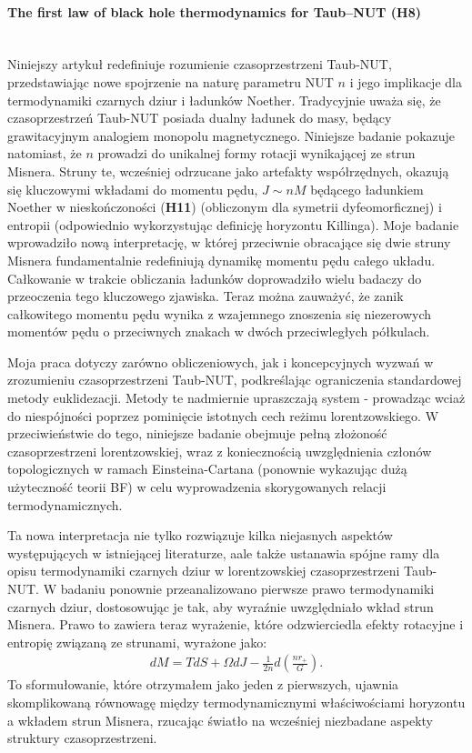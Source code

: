 \documentclass[12pt,a4paper]{article}
\newcommand{\myparagraph}[1]{\paragraph{#1}\mbox{}\\}
\begin{document}

\myparagraph{The first law of black hole thermodynamics for Taub–NUT (H8)} 

Niniejszy artykuł redefiniuje rozumienie czasoprzestrzeni Taub-NUT, przedstawiając nowe spojrzenie na naturę parametru NUT $n$ i jego implikacje dla termodynamiki czarnych dziur i ładunków Noether. Tradycyjnie uważa się, że czasoprzestrzeń Taub-NUT posiada dualny ładunek do masy, będący grawitacyjnym analogiem monopolu magnetycznego. Niniejsze badanie pokazuje natomiast, że $n$ prowadzi do unikalnej formy rotacji wynikającej ze strun Misnera. Struny te, wcześniej odrzucane jako artefakty współrzędnych, okazują się kluczowymi wkładami do momentu pędu, $J\sim n M$ będącego ładunkiem Noether w nieskończoności (\textbf{H11}) (obliczonym dla symetrii dyfeomorficznej) i entropii (odpowiednio wykorzystując definicję horyzontu Killinga). Moje badanie wprowadziło nową interpretację, w której przeciwnie obracające się dwie struny Misnera fundamentalnie redefiniują dynamikę momentu pędu całego układu. Całkowanie w trakcie obliczania ładunków doprowadziło wielu badaczy do przeoczenia tego kluczowego zjawiska. Teraz można zauważyć, że zanik całkowitego momentu pędu wynika z wzajemnego znoszenia się niezerowych momentów pędu o przeciwnych znakach w dwóch przeciwległych półkulach.

Moja praca dotyczy zarówno obliczeniowych, jak i koncepcyjnych wyzwań w zrozumieniu czasoprzestrzeni Taub-NUT, podkreślając ograniczenia standardowej metody euklidezacji. Metody te nadmiernie upraszczają system - prowadząc wciaż do niespójności poprzez pominięcie istotnych cech reżimu lorentzowskiego. W przeciwieństwie do tego, niniejsze badanie obejmuje pełną złożoność czasoprzestrzeni lorentzowskiej, wraz z koniecznością uwzględnienia członów topologicznych w ramach Einsteina-Cartana (ponownie wykazując dużą użyteczność teorii BF) w celu wyprowadzenia skorygowanych relacji termodynamicznych.

Ta nowa interpretacja nie tylko rozwiązuje kilka niejasnych aspektów występujących w istniejącej literaturze, aale także ustanawia spójne ramy dla opisu termodynamiki czarnych dziur w lorentzowskiej czasoprzestrzeni Taub-NUT. W badaniu ponownie przeanalizowano pierwsze prawo termodynamiki czarnych dziur, dostosowując je tak, aby wyraźnie uwzględniało wkład strun Misnera. Prawo to zawiera teraz wyrażenie, które odzwierciedla efekty rotacyjne i entropię związaną ze strunami, wyrażone jako:
\begin{align}
	dM = T dS + \Omega dJ - \frac{1}{2n} d\left(\frac{nr_+}{G}\right).
\end{align}
To sformułowanie, które otrzymałem jako jeden z pierwszych, ujawnia skomplikowaną równowagę między termodynamicznymi właściwościami horyzontu a wkładem strun Misnera, rzucając światło na wcześniej niezbadane aspekty struktury czasoprzestrzeni.
\end{document}
